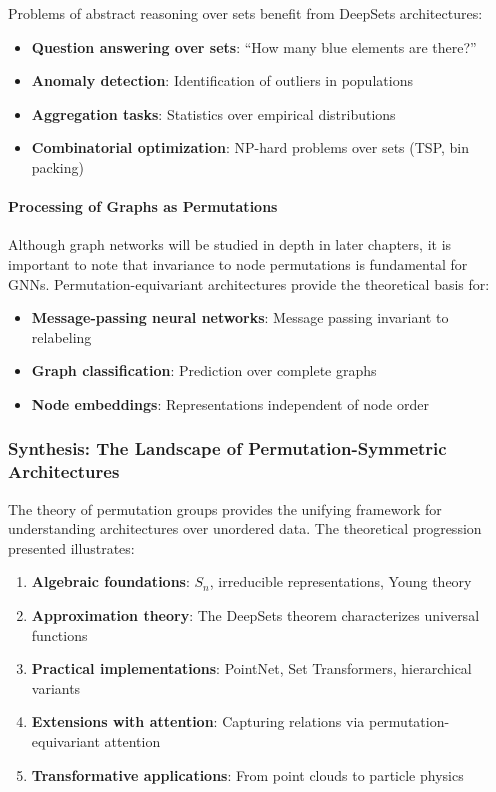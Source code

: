 Problems of abstract reasoning over sets benefit from DeepSets architectures:

\begin{itemize}
    \item \textbf{Question answering over sets}: ``How many blue elements are there?''
    \item \textbf{Anomaly detection}: Identification of outliers in populations
    \item \textbf{Aggregation tasks}: Statistics over empirical distributions
    \item \textbf{Combinatorial optimization}: NP-hard problems over sets (TSP, bin packing)
\end{itemize}

\paragraph{Processing of Graphs as Permutations}

Although graph networks will be studied in depth in later chapters, it is important to note that invariance to node permutations is fundamental for \glspl{GNN}. Permutation-equivariant architectures provide the theoretical basis for:

\begin{itemize}
    \item \textbf{Message-passing neural networks}: Message passing invariant to relabeling
    \item \textbf{Graph classification}: Prediction over complete graphs
    \item \textbf{Node embeddings}: Representations independent of node order
\end{itemize}

\subsubsection{Synthesis: The Landscape of Permutation-Symmetric Architectures}

The theory of permutation groups provides the unifying framework for understanding architectures over unordered data. The theoretical progression presented illustrates:

\begin{enumerate}
    \item \textbf{Algebraic foundations}: $S_n$, irreducible representations, Young theory
    \item \textbf{Approximation theory}: The DeepSets theorem characterizes universal functions
    \item \textbf{Practical implementations}: PointNet, Set Transformers, hierarchical variants
    \item \textbf{Extensions with attention}: Capturing relations via permutation-equivariant attention
    \item \textbf{Transformative applications}: From point clouds to particle physics
\end{enumerate}

